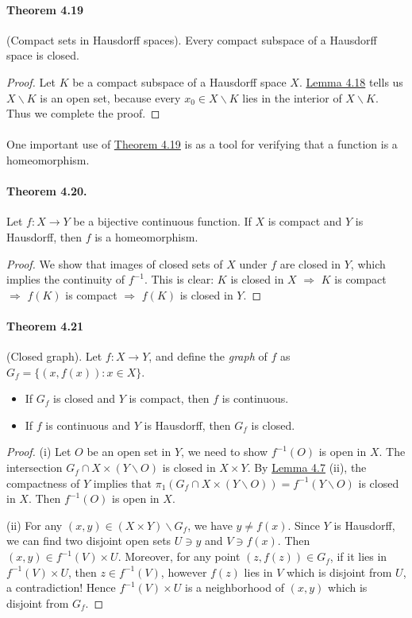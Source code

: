 \documentclass{article}
\numberwithin{equation}{section}
\theoremstyle{plain}
\theoremstyle{definition}
\begin{document}
\paragraph{Theorem 4.19\label{thm:4.19}} (Compact sets in Hausdorff spaces). Every compact subspace of a Hausdorff space is closed.
\begin{proof}
Let $K$ be a compact subspace of a Hausdorff space $X$. \hyperref[lemma:4.18]{Lemma 4.18} tells us $X\backslash K$ is an open set, because every $x_0\in X\backslash K$ lies in the interior of $X\backslash K$. Thus we complete the proof.
\end{proof}

\paragraph{} One important use of \hyperref[thm:4.19]{Theorem 4.19} is as a tool for verifying that a function is a homeomorphism.

\paragraph{Theorem 4.20.\label{thm:4.20}} Let $f:X\to Y$ be a bijective continuous function. If $X$ is compact and $Y$ is Hausdorff, then $f$ is a homeomorphism.
\begin{proof}
We show that images of closed sets of $X$ under $f$ are closed in $Y$, which implies the continuity of $f^{-1}$. This is clear: $K$ is closed in $X$ $\Rightarrow$ $K$ is compact $\Rightarrow$ $f(K)$ is compact $\Rightarrow$ $f(K)$ is closed in $Y$.
\end{proof}

\paragraph{Theorem 4.21\label{thm:4.21}} (Closed graph). Let $f:X\to Y$, and define the \textit{graph} of $f$ as $G_f=\{(x,f(x)):x\in X\}$.
\begin{itemize}
	\item[(i)] If $G_f$ is closed and $Y$ is compact, then $f$ is continuous.
	\item[(ii)] If $f$ is continuous and $Y$ is Hausdorff, then $G_f$ is closed.
\end{itemize}

\begin{proof}
(i) Let $O$ be an open set in $Y$, we need to show $f^{-1}(O)$ is open in $X$. The intersection $G_f\cap X\times(Y\backslash O)$ is closed in $X\times Y$. By \hyperref[lemma:4.7]{Lemma 4.7} (ii), the compactness of $Y$ implies that $\pi_1(G_f\cap X\times(Y\backslash O)) = f^{-1}(Y\backslash O)$ is closed in $X$. Then $f^{-1}(O)$ is open in $X$.

(ii) For any $(x,y)\in(X\times Y)\backslash G_f$, we have $y\neq f(x)$. Since $Y$ is Hausdorff, we can find two disjoint open sets $U\ni y$ and $V\ni f(x)$. Then $(x,y)\in f^{-1}(V)\times U$. Moreover, for any point $(z,f(z))\in G_f$, if it lies in $f^{-1}(V)\times U$, then $z\in f^{-1}(V)$, however $f(z)$ lies in $V$ which is disjoint from $U$, a contradiction! Hence $f^{-1}(V)\times U$ is a neighborhood of $(x,y)$ which is disjoint from $G_f$.
\end{proof}
\end{document}
